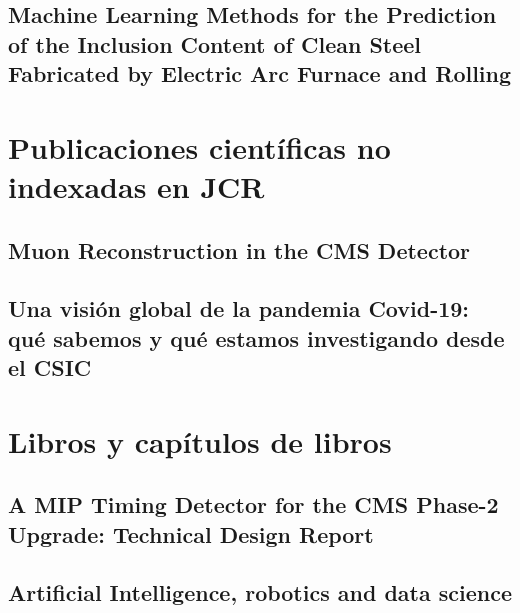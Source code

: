 \documentclass[a4paper, 11pt, twoside, openright]{report}
\begin{document}
\subsection{Machine Learning Methods for the Prediction of the Inclusion Content of Clean Steel Fabricated by Electric Arc Furnace and Rolling}



\section{Publicaciones científicas no indexadas en JCR}

\subsection{Muon Reconstruction in the CMS Detector}


\subsection{Una visión global de la pandemia Covid-19: qué sabemos y qué estamos investigando desde el CSIC}


\section{Libros y capítulos de libros}

\subsection{A MIP Timing Detector for the CMS Phase-2 Upgrade: Technical Design Report}


\subsection{Artificial Intelligence, robotics and data science}

\end{document}
